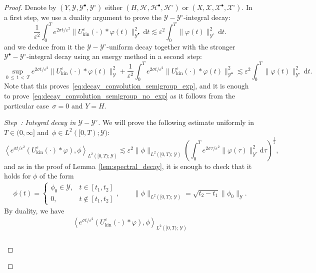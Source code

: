 \documentclass[AHL,Unicode,longabstracts,published]{cedram}
\newcommand{\kin}{\mathrm{kin}}
\renewcommand{\d}{\mathrm{d}}
\newcommand{\XX}{\mathcal{X}}
\newcommand{\HH}{\mathcal{H}}
\newcommand{\VV}{\mathcal{Y}}
\newcommand{\Ss}{H}
\newcommand{\SSs}{\HH}
\newcommand{\SSsp}{\HH^{\bullet}}
\newcommand{\SSsm}{\HH^{\circ}}
\newcommand{\Sl}{X}
\newcommand{\SSl}{\XX}
\newcommand{\SSlp}{\XX^{\bullet}}
\newcommand{\SSlm}{\XX^{\circ}}
\newcommand{\Sg}{Y}
\newcommand{\SSg}{\VV}
\newcommand{\SSgp}{\VV^{\bullet}}
\newcommand{\SSgm}{\VV^{\circ}}
\renewcommand*\le{\leqslant}
\newcommand*\eps{{\varepsilon}}
\newcommand{\la}{\langle}
\newcommand{\ra}{\rangle}
\newcounter{stepcount}
\newenvironment{step}[1]{\refstepcounter{stepcount}\begin{proof}[Step~\thestepcount: #1]}{\let\qed\relax\end{proof}}
\begin{document}
\begin{proof}
Denote by $(\Sg, \SSg, \SSgp, \SSgm)$ either $(\Ss, \SSs, \SSsp, \SSsm)$ or $(\Sl, \SSl, \SSlp, \SSlm)$. In a first step, we use a duality argument to prove the $\SSg-\SSgm$-integral decay:
\begin{equation*}
\frac{1}{\eps^2} \int_0^T e^{2 \sigma t / \eps^2} \| U^\eps_\kin(\cdot) * \varphi (t) \|_{\SSgp}^2 \, \d t \lesssim \eps^2 \int_0^T \| \varphi(t) \|_{ \SSgm }^2 \, \d t.
\end{equation*}
and we deduce from it the $\SSg-\SSgm$-uniform decay together with the stronger $\SSgp-\SSgm$-integral decay using an energy method in a second~step:
\begin{equation*}
\sup_{0\,\le\,t\,<\,T} e^{2 \sigma t / \eps^2} \| U^\eps_\kin(\cdot) * \varphi (t) \|_{\SSg}^2 + \frac{1}{\eps^2} \int_0^T e^{2 \sigma t / \eps^2} \| U^\eps_\kin(\cdot) * \varphi (t) \|_{\SSgp}^2 \lesssim \eps^2 \int_0^T \| \varphi(t) \|_{ \SSgm }^2 \, \d t.
\end{equation*}
Note that this proves~\eqref{eq:decay_convolution_semigroup_exp}, and it is enough to prove~\eqref{eq:decay_convolution_semigroup_no_exp} as it follows from the particular case~$\sigma = 0$ and $\Sg = \Ss$.
\setcounter{stepcount}{0}
\begin{step}{{Integral decay in $\SSg-\SSgm$}}\label{prflemm4.9step1}
We will prove the following estimate uniformly in $T \in (0, \infty]$ and~$\phi \in L^2([0, T) ; \SSg)$:
\[
\left\la e^{\sigma t / \eps^2 } \left(U^\eps_\kin(\cdot) * \varphi\right), \phi \right\ra_{L^2\left([0, T) ; \SSg\right) } \lesssim \eps^2 \| \phi \|_{L^2\left([0, T) ; \,\SSg\right) } \left(\int_0^T e^{2\sigma \tau / \eps^2 } \| \varphi(\tau) \|_{\SSgm}^2 \d \tau\right)^{\frac{1}{2}},
\]
and as in the proof of Lemma~\ref{lem:spectral_decay}, it is enough to check that it holds for $\phi$ of the form
\begin{gather*}
\phi(t) =
\begin{cases}
\phi_0 \in \SSg, & t \in [t_1, t_2]\\
0, & t \notin [t_1, t_2]
\end{cases}, \qquad \| \phi \|_{ L^2\left([0, T) ;\,\SSg \right) } = \sqrt{t_2 - t_1} \| \phi_0 \|_{\SSg}.
\end{gather*}
By duality, we have
\begin{multline*}
\left\la e^{\sigma t / \eps^2} (U^\eps_\kin(\cdot) * \varphi), \phi \right\ra_{ L^2\left([0, T) ;\,\SSg \right) } \\
\begin{aligned}

\end{aligned}
\end{multline*}
\end{step}
\end{proof}
\end{document}
